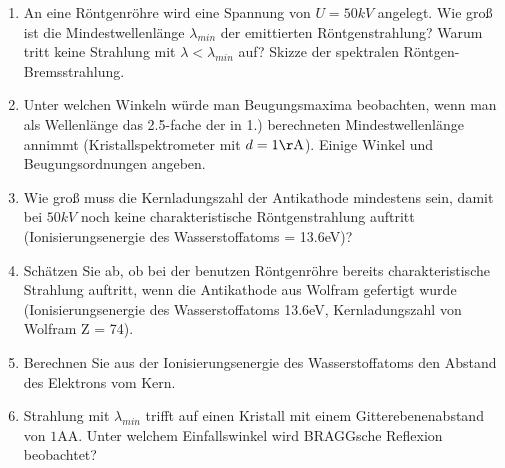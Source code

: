 \documentclass[12pt,a4paper,ngerman]{article}
\begin{document}
\begin{framed}
\begin{enumerate}
\item An eine Röntgenröhre wird eine Spannung von $U = 50kV$ angelegt. Wie groß ist die Mindestwellenlänge $\lambda_{min}$ der emittierten Röntgenstrahlung? Warum tritt keine Strahlung mit $\lambda < \lambda_{min}$ auf? Skizze der spektralen Röntgen-Bremsstrahlung.
\item Unter welchen Winkeln würde man Beugungsmaxima beobachten, wenn man als Wellenlänge das 2.5-fache der in 1.) berechneten Mindestwellenlänge annimmt (Kristallspektrometer mit $d = 1 \mathrm{\AA}$). Einige Winkel und Beugungsordnungen angeben.
\item Wie groß muss die Kernladungszahl der Antikathode mindestens sein, damit bei $50kV$ noch keine charakteristische Röntgenstrahlung auftritt (Ionisierungsenergie des Wasserstoffatoms = 13.6eV)?
\item Schätzen Sie ab, ob bei der benutzen Röntgenröhre bereits charakteristische Strahlung auftritt, wenn die Antikathode aus Wolfram gefertigt wurde (Ionisierungsenergie des Wasserstoffatoms 13.6eV, Kernladungszahl von Wolfram Z = 74).
\item Berechnen Sie aus der Ionisierungsenergie des Wasserstoffatoms den Abstand des Elektrons vom Kern.
\item Strahlung mit $\lambda_{min}$ trifft auf einen Kristall mit einem Gitterebenenabstand von $1 \mathrm{AA}$. Unter welchem Einfallswinkel wird BRAGGsche Reflexion beobachtet?
\end{enumerate}
\end{framed}
\end{document}

